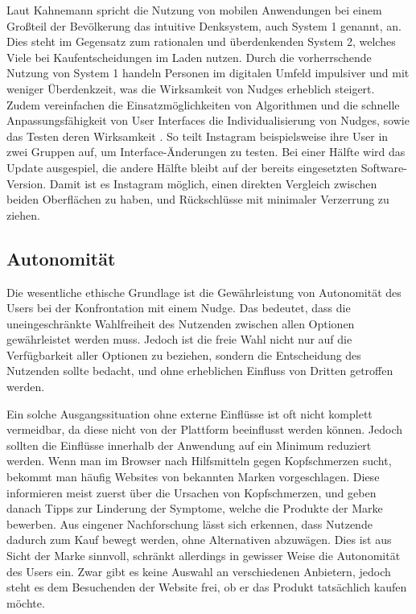 Laut Kahnemann spricht die Nutzung von mobilen Anwendungen bei einem Großteil der Bevölkerung das intuitive Denksystem, auch System 1 genannt, an. Dies steht im Gegensatz zum rationalen und überdenkenden System 2, welches Viele bei Kaufentscheidungen im Laden nutzen. Durch die vorherrschende Nutzung von System 1 handeln Personen im digitalen Umfeld impulsiver und mit weniger Überdenkzeit, \parencite[Absatz 1b]{Kahneman.2012} was die Wirksamkeit von Nudges erheblich steigert. Zudem vereinfachen die Einsatzmöglichkeiten von Algorithmen und die schnelle Anpassungsfähigkeit von User Interfaces die Individualisierung von Nudges, sowie das Testen deren Wirksamkeit \parencite[S. 88]{Reisch.2020}. So teilt Instagram beispielsweise ihre User in zwei Gruppen auf, um Interface-Änderungen zu testen. Bei einer Hälfte wird das Update ausgespiel, die andere Hälfte bleibt auf der bereits eingesetzten Software-Version. Damit ist es Instagram möglich, einen direkten Vergleich zwischen beiden Oberflächen zu haben, und Rückschlüsse mit minimaler Verzerrung zu ziehen.
\subsection{Autonomität}
Die wesentliche ethische Grundlage ist die Gewährleistung von Autonomität des Users bei der Konfrontation mit einem Nudge. Das bedeutet, dass die uneingeschränkte Wahlfreiheit des Nutzenden zwischen allen Optionen gewährleistet werden muss. \parencite[S. 88]{Reisch.2020} Jedoch ist die freie Wahl nicht nur auf die Verfügbarkeit aller Optionen zu beziehen, sondern die Entscheidung des Nutzenden sollte bedacht, und ohne erheblichen Einfluss von Dritten getroffen werden. \parencite[S. 6]{Lembcke.2019}

Ein solche Ausgangssituation ohne externe Einflüsse ist oft nicht komplett vermeidbar, da diese nicht von der Plattform beeinflusst werden können. Jedoch sollten die Einflüsse innerhalb der Anwendung auf ein Minimum reduziert werden. \parencite[S. 88]{Reisch.2020}Wenn man im Browser nach Hilfsmitteln gegen Kopfschmerzen sucht, bekommt man häufig Websites von bekannten Marken vorgeschlagen. Diese informieren meist zuerst über die Ursachen von Kopfschmerzen, und geben danach Tipps zur Linderung der Symptome, welche die Produkte der Marke bewerben. Aus eingener Nachforschung lässt sich erkennen, dass Nutzende dadurch zum Kauf bewegt werden, ohne Alternativen abzuwägen. Dies ist aus Sicht der Marke sinnvoll, schränkt allerdings in gewisser Weise die Autonomität des Users ein. Zwar gibt es keine Auswahl an verschiedenen Anbietern, jedoch steht es dem Besuchenden der Website frei, ob er das Produkt tatsächlich kaufen möchte.

